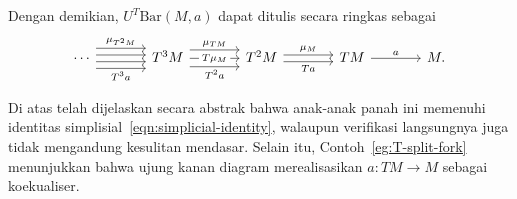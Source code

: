 \begin{example}
	Dengan demikian, $U^T\mathrm{Bar}(M,a)$ dapat ditulis secara ringkas
	sebagai
	\begin{equation}\label{eqn:bar-simplicial-resolution}
		\begin{tikzcd}[column sep=large]
			\cdots \arrow[r, shift left=3, "{\mu_{T^2 M}}"] \arrow[r, shift left=1] \arrow[r, shift right=1] \arrow[r, shift right=3, "{T^3 a}"'] & T^3 M \arrow[r, shift left=2.5, "\mu_{TM}"] \arrow[r, "{T\mu_M}" description] \arrow[r, shift right=2.5, "{T^2 a}"'] & T^2 M \arrow[r, shift left, "{\mu_M}"] \arrow[shift right, r, "Ta"'] & TM \arrow[r, "a"] & M .
		\end{tikzcd}
	\end{equation}

	Di atas telah dijelaskan secara abstrak bahwa anak-anak panah ini memenuhi
	identitas simplisial~\eqref{eqn:simplicial-identity}, walaupun
	verifikasi langsungnya juga tidak mengandung kesulitan mendasar. Selain
	itu, Contoh~\ref{eg:T-split-fork} menunjukkan bahwa ujung kanan diagram
	merealisasikan $a:TM\to M$ sebagai koekualiser.
\end{example}
